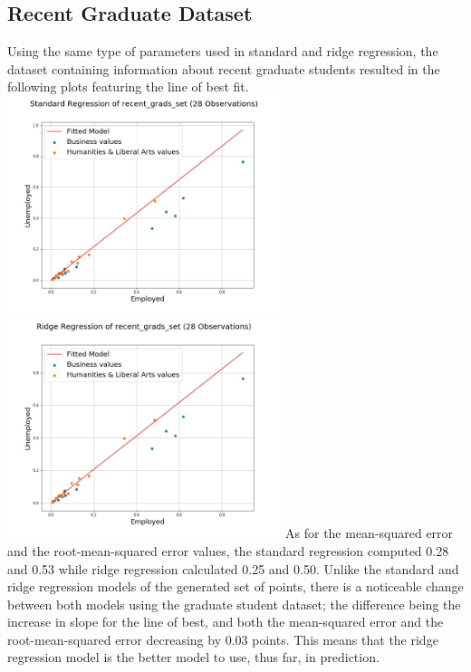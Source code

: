 \documentclass[a4paper,12pt]{IEEEtran}
\begin{document}
\subsection{Recent Graduate Dataset}
\label{recent_grad}
Using the same type of parameters used in standard and ridge regression, the dataset containing information about recent graduate students resulted in the following plots featuring the line of best fit. \includegraphics[width=8cm]{std_reg_1d_recent_grads_set} \includegraphics[width=8cm]{ridge_reg_1d_recent_grads_set} As for the mean-squared error and the root-mean-squared error values, the standard regression computed 0.28 and 0.53 while ridge regression calculated 0.25 and 0.50. Unlike the standard and ridge regression models of the generated set of points, there is a noticeable change between both models using the graduate student dataset; the difference being the increase in slope for the line of best, and both the mean-squared error and the root-mean-squared error decreasing by 0.03 points. This means that the ridge regression model is the better model to use, thus far, in prediction.
\end{document}
